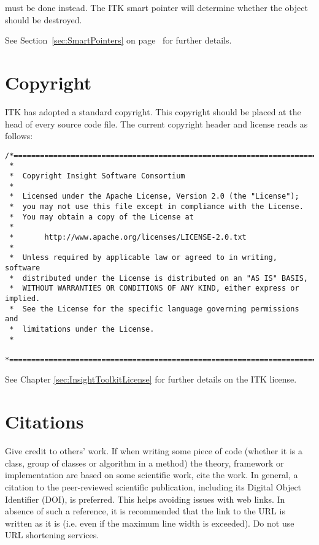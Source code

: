 must be done instead. The ITK smart pointer will determine whether the object
should be destroyed.

See Section~\ref{sec:SmartPointers} on page~\pageref{sec:SmartPointers} for
further details.


\section{Copyright}
\label{sec:Copyright}

ITK has adopted a standard copyright. This copyright should be placed at the
head of every source code file. The current copyright header and license reads
as follows:

\small
\begin{verbatim}
/*=========================================================================
 *
 *  Copyright Insight Software Consortium
 *
 *  Licensed under the Apache License, Version 2.0 (the "License");
 *  you may not use this file except in compliance with the License.
 *  You may obtain a copy of the License at
 *
 *       http://www.apache.org/licenses/LICENSE-2.0.txt
 *
 *  Unless required by applicable law or agreed to in writing, software
 *  distributed under the License is distributed on an "AS IS" BASIS,
 *  WITHOUT WARRANTIES OR CONDITIONS OF ANY KIND, either express or implied.
 *  See the License for the specific language governing permissions and
 *  limitations under the License.
 *
 *=========================================================================*/
\end{verbatim}
\normalsize

See Chapter \ref{sec:InsightToolkitLicense} for further details on the ITK
license.


\section{Citations}
\label{sec:Citations}

Give credit to others' work. If when writing some piece of code (whether it is a
class, group of classes or algorithm in a method) the theory, framework or
implementation are based on some scientific work, cite the work. In general, a
citation to the peer-reviewed scientific publication, including its Digital
Object Identifier (DOI), is preferred. This helps avoiding issues with web
links. In absence of such a reference, it is recommended that the link to the
URL is written as it is (i.e. even if the maximum line width is exceeded). Do
not use URL shortening services.

